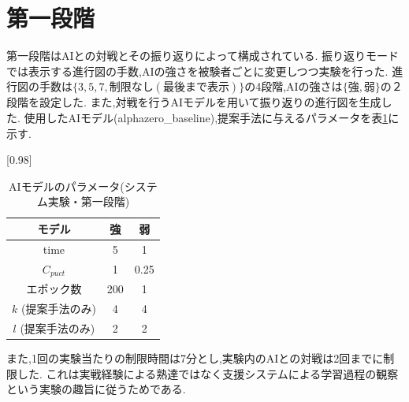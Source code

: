 \section{第一段階}
第一段階はAIとの対戦とその振り返りによって構成されている.
振り返りモードでは表示する進行図の手数,AIの強さを被験者ごとに変更しつつ実験を行った.
進行図の手数は$\{3, 5, 7, 制限なし(最後まで表示)\}$の4段階,AIの強さは$\{強,弱\}$の２段階を設定した.
また,対戦を行うAIモデルを用いて振り返りの進行図を生成した.
使用したAIモデル(alphazero\_baseline),提案手法に与えるパラメータを表\ref{table:param-system}に示す.
\begin{table}[H]
	\caption{AIモデルのパラメータ(システム実験・第一段階)}
    \label{table:param-system}
	\centering
	\scalebox{0.98}[0.98]{
		\begin{tabular}{c|c|c}
			モデル&強&弱\\\hline
			time    & 5 & 1 \\ 
			$C_{puct}$ & 1   & 0.25 \\
            エポック数 & 200 & 1 \\
			$k$ (提案手法のみ)     & 4 & 4 \\
			$l$ (提案手法のみ)     & 2 & 2 \\

		\end{tabular}
	}
	
\end{table}
また,1回の実験当たりの制限時間は7分とし,実験内のAIとの対戦は2回までに制限した.
これは実戦経験による熟達ではなく支援システムによる学習過程の観察という実験の趣旨に従うためである.

